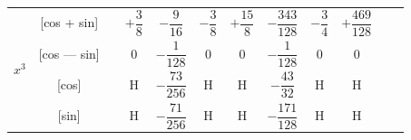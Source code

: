 \documentclass[11pt,a4paper]{book}
\begin{document}
{{\begin{center}
\begin{tabular}{|c|c|c|c|c|c|c|c|c|c|c|c|}
\hline
\multirow{4}{*}{$x^3$} & [cos + sin] & & $+\dfrac{3}{8}$ & $-\dfrac{9}{16}$ & $-\dfrac{3}{8}$ & $+\dfrac{15}{8}$ & $-\dfrac{343}{128}$ & $-\dfrac{3}{4}$ & $+\dfrac{469}{128}$ \\
& [cos --- sin] & & $0$ & $-\dfrac{1}{128}$ & $0$ & $0$ & $-\dfrac{1}{128}$ & $0$ & $0$ \\
& [cos] & & H & $-\dfrac{73}{256}$ & H & H & $-\dfrac{43}{32}$ & H & H \\
& [sin] & & H & $-\dfrac{71}{256}$ & H & H & $-\dfrac{171}{128}$ & H & H \\
\hline
\end{tabular}
\end{center}

\vspace{1em}


}}
\end{document}
